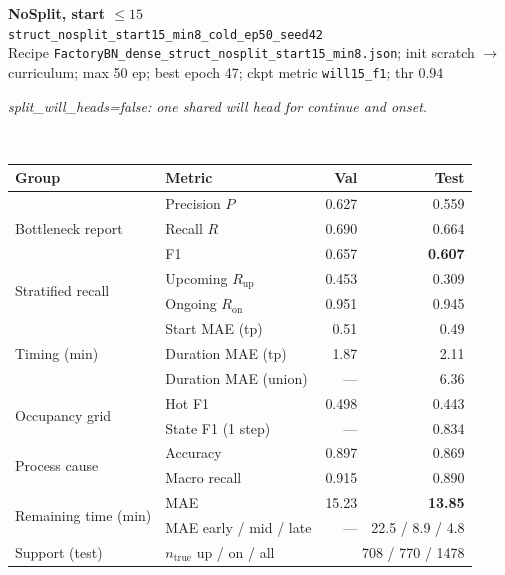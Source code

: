 \documentclass[9pt,a4paper,twocolumn]{extarticle}
\begin{document}
\noindent\begin{minipage}{\columnwidth}
\begin{center}
{\small\bfseries NoSplit, start $\le 15$}\\
{\scriptsize\texttt{struct\_nosplit\_start15\_min8\_cold\_ep50\_seed42}}\\
{\scriptsize Recipe \texttt{FactoryBN\_dense\_struct\_nosplit\_start15\_min8.json}; init scratch $\to$ curriculum; max 50 ep; best epoch 47; ckpt metric \texttt{will15\_f1}; thr 0.94}\\[1pt]
\parbox{0.96\columnwidth}{\scriptsize\itshape split\_will\_heads=false: one shared will head for continue and onset.}\\[2pt]
\scriptsize\setlength{\tabcolsep}{3pt}
\begin{tabular}{llrr}
\toprule
Group & Metric & Val & Test \\
\midrule
\multirow{3}{*}{Bottleneck report}
  & Precision $P$ & 0.627 & 0.559 \\
  & Recall $R$ & 0.690 & 0.664 \\
  & F1 & 0.657 & \textbf{0.607} \\
\midrule
\multirow{2}{*}{Stratified recall}
  & Upcoming $R_{\mathrm{up}}$ & 0.453 & 0.309 \\
  & Ongoing $R_{\mathrm{on}}$ & 0.951 & 0.945 \\
\midrule
\multirow{3}{*}{Timing (min)}
  & Start MAE (tp) & 0.51 & 0.49 \\
  & Duration MAE (tp) & 1.87 & 2.11 \\
  & Duration MAE (union) & --- & 6.36 \\
\midrule
\multirow{2}{*}{Occupancy grid}
  & Hot F1 & 0.498 & 0.443 \\
  & State F1 (1 step) & --- & 0.834 \\
\midrule
\multirow{2}{*}{Process cause}
  & Accuracy & 0.897 & 0.869 \\
  & Macro recall & 0.915 & 0.890 \\
\midrule
\multirow{2}{*}{Remaining time (min)}
  & MAE & 15.23 & \textbf{13.85} \\
  & MAE early / mid / late & --- & 22.5 / 8.9 / 4.8 \\
\midrule
Support (test)
  & $n_{\mathrm{true}}$ up / on / all & \multicolumn{2}{r}{708 / 770 / 1478} \\
\bottomrule
\end{tabular}
\end{center}
\end{minipage}\par\vspace{6pt}
\end{document}
